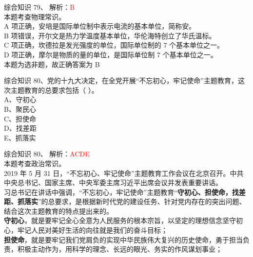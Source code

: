 \documentclass[aspectratio=169]{beamer}
\begin{document}
\begin{frame}[t]{综合知识}
    79、  解析：\textcolor{red}{B}\\
    本题考查物理常识。\\
    A 项正确，安培是国际单位制中表示电流的基本单位，简称安。\\
    B 项错误，开尔文是热力学温度基本单位，华伦海特创立了华氏温标。\\
    C 项正确，坎德拉是发光强度的单位，国际单位制的 7 个基本单位之一。\\
    D 项正确，摩尔是物质的量的单位，是国际单位制 7 个基本单位之一。\\
    本题为选非题，故正确答案为 B\\
\end{frame}                           


\begin{frame}[t]{综合知识}
    80、党的十九大决定，在全党开展“不忘初心，牢记使命”主题教育，这次主题教育的总要求包括（ ）。 \\
    A、守初心                                                                                   \\
    B、聚民心                                                                                   \\
    C、担使命                                                                                   \\
    D、找差距                                                                                   \\
    E、抓落实                                                                                   \\
\end{frame}                           


\begin{frame}[t]{综合知识}
    80、  解析：\textcolor{red}{ACDE}\\
    本题考查政治常识。\\
    {\small
    2019 年 5 月 31 日，“不忘初心、牢记使命”主题教育工作会议在北京召开。中共中央总书记、国家主席、中央军委主席习近平出席会议并发表重要讲话。\\
    习总书记在讲话中强调，“不忘初心，牢记使命”主题教育“\textbf{守初心、担使命，找差距、抓落实}”的总要求，是根据新时代党的建设任务、针对党内存在的突出问题、结合这次主题教育的特点提出来的。\\
    \textbf{守初心}，就是要牢记全心全意为人民服务的根本宗旨，以坚定的理想信念坚守初心，牢记人民对美好生活的向往就是我们的奋斗目标；\\
    \textbf{担使命}，就是要牢记我们党肩负的实现中华民族伟大复兴的历史使命，勇于担当负责，积极主动作为，用科学的理念、长远的眼光、务实的作风谋划事业；\\
    }
\end{frame}                           
\end{document}
